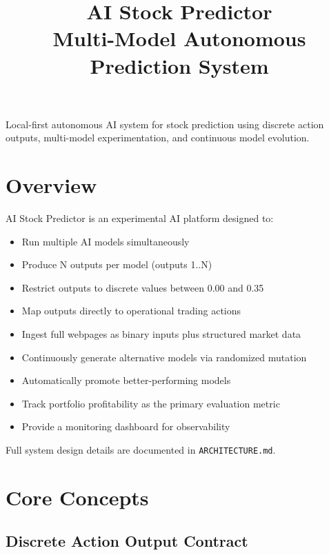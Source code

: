 \documentclass[11pt]{article}
\title{\textbf{AI Stock Predictor}\\
\large Multi-Model Autonomous Prediction System}
\author{}
\date{}
\begin{document}
\maketitle

\begin{center}
\begin{tcolorbox}[colback=primary!5,colframe=primary,width=0.9\textwidth]
Local-first autonomous AI system for stock prediction using discrete action outputs, multi-model experimentation, and continuous model evolution.
\end{tcolorbox}
\end{center}

\section*{Overview}

AI Stock Predictor is an experimental AI platform designed to:

\begin{itemize}[leftmargin=1.5em]
\item Run multiple AI models simultaneously
\item Produce N outputs per model (outputs 1..N)
\item Restrict outputs to discrete values between 0.00 and 0.35
\item Map outputs directly to operational trading actions
\item Ingest full webpages as binary inputs plus structured market data
\item Continuously generate alternative models via randomized mutation
\item Automatically promote better-performing models
\item Track portfolio profitability as the primary evaluation metric
\item Provide a monitoring dashboard for observability
\end{itemize}

Full system design details are documented in \texttt{ARCHITECTURE.md}.

\section*{Core Concepts}

\subsection*{Discrete Action Output Contract}
\end{document}
